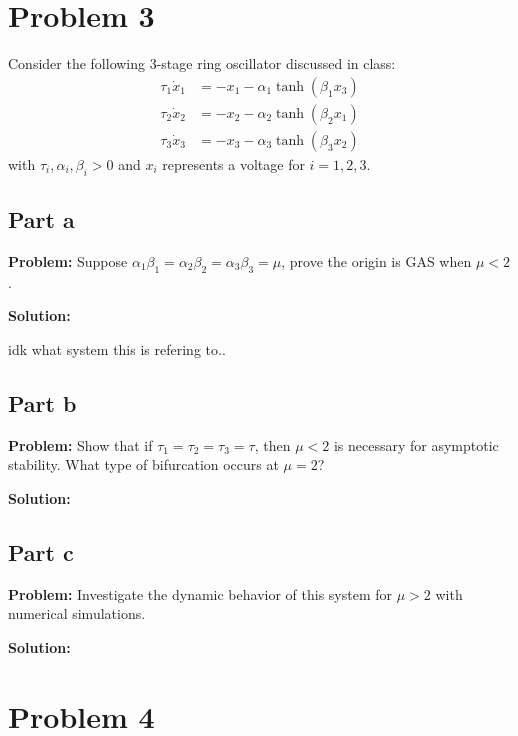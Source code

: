 \documentclass[letter]{article}
\begin{document}
\newpage
\section{Problem 3}
Consider the following 3-stage ring oscillator discussed in class:
\begin{align*}
	\tau_1 \dot{x}_1 &= -x_1 - \alpha_1 \tanh(\beta_1 x_3)\\
	\tau_2 \dot{x}_2 &= -x_2 - \alpha_2 \tanh(\beta_2 x_1)\\
	\tau_3 \dot{x}_3 &= -x_3 - \alpha_3 \tanh(\beta_3 x_2)
\end{align*}
with $\tau_i, \alpha_i, \beta_i > 0$ and $x_i$ represents a voltage for $i = 1,2,3$.

\subsection{Part a}
\textbf{Problem:}
Suppose $\alpha_1 \beta_1 = \alpha_2 \beta_2 = \alpha_3 \beta_3 = \mu$, prove the origin is GAS when $\mu < 2$.

\textbf{Solution:}


idk what system this is refering to..



\subsection{Part b}
\textbf{Problem:}
Show that if $\tau_1 = \tau_2 = \tau_3 = \tau$, then $\mu <2$ is necessary for asymptotic stability. What type of bifurcation occurs at $\mu = 2$?

\textbf{Solution:}



\subsection{Part c}
\textbf{Problem:}
Investigate the dynamic behavior of this system for $\mu > 2$ with numerical simulations.

\textbf{Solution:}










\newpage
\section{Problem 4}
\end{document}
